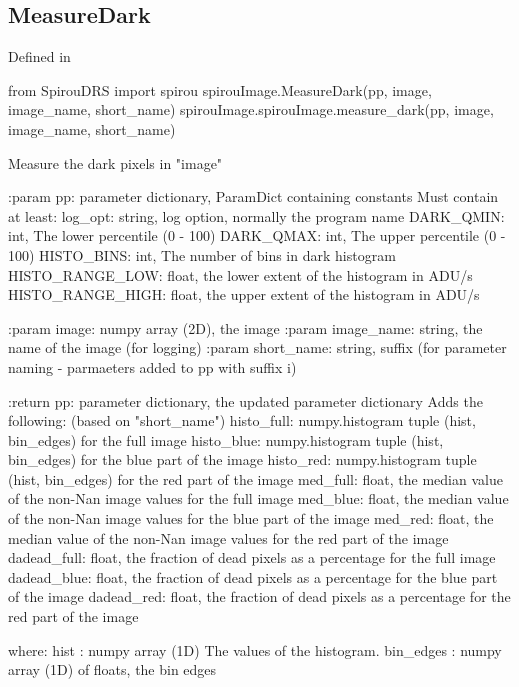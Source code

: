 \begin{minipage}{\textwidth}
\subsection{MeasureDark}

Defined in \spirouImage{}

\begin{pythonbox}
from SpirouDRS import spirou
spirouImage.MeasureDark(pp, image, image_name, short_name)
spirouImage.spirouImage.measure_dark(pp, image, image_name, short_name)
\end{pythonbox}

\begin{pythondocstring}
Measure the dark pixels in "image"

:param pp: parameter dictionary, ParamDict containing constants
    Must contain at least:
            log_opt: string, log option, normally the program name
            DARK_QMIN: int, The lower percentile (0 - 100)
            DARK_QMAX: int, The upper percentile (0 - 100)
            HISTO_BINS: int,  The number of bins in dark histogram
            HISTO_RANGE_LOW: float, the lower extent of the histogram
                             in ADU/s
            HISTO_RANGE_HIGH: float, the upper extent of the histogram
                              in ADU/s

:param image: numpy array (2D), the image
:param image_name: string, the name of the image (for logging)
:param short_name: string, suffix (for parameter naming -
                    parmaeters added to pp with suffix i)

:return pp: parameter dictionary, the updated parameter dictionary
        Adds the following: (based on "short_name")
            histo_full: numpy.histogram tuple (hist, bin_edges) for
                        the full image
            histo_blue: numpy.histogram tuple (hist, bin_edges) for
                        the blue part of the image
            histo_red: numpy.histogram tuple (hist, bin_edges) for
                        the red part of the image
            med_full: float, the median value of the non-Nan image values
                      for the full image
            med_blue: float, the median value of the non-Nan image values
                      for the blue part of the image
            med_red: float, the median value of the non-Nan image values
                     for the red part of the image
            dadead_full: float, the fraction of dead pixels as a percentage
                         for the full image
            dadead_blue: float, the fraction of dead pixels as a percentage
                         for the blue part of the image
            dadead_red: float, the fraction of dead pixels as a percentage
                        for the red part of the image

      where:
          hist : numpy array (1D) The values of the histogram.
          bin_edges : numpy array (1D) of floats, the bin edges
\end{pythondocstring}
\end{minipage}

